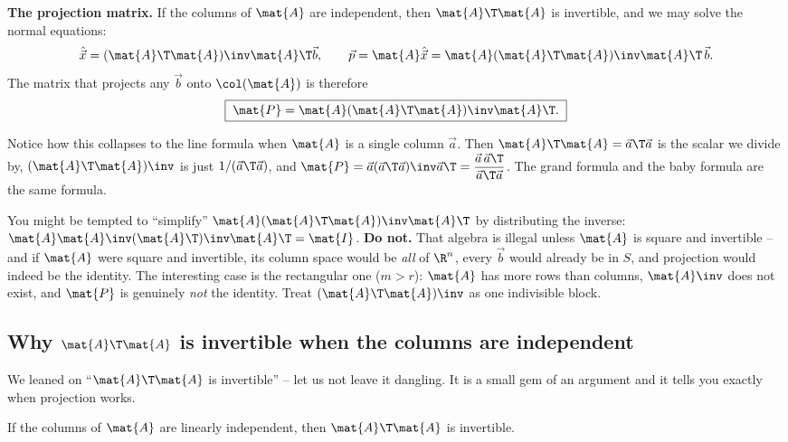 \begin{formalbox}
\textbf{The projection matrix.} If the columns of $\mat{A}$ are independent, then $\mat{A}\T\mat{A}$
is invertible, and we may solve the normal equations:
\[
  \hat{\vec{x}} = (\mat{A}\T\mat{A})\inv\mat{A}\T\vec{b},
  \qquad
  \vec{p} = \mat{A}\hat{\vec{x}} = \mat{A}(\mat{A}\T\mat{A})\inv\mat{A}\T\,\vec{b}.
\]
The matrix that projects any $\vec{b}$ onto $\col(\mat{A})$ is therefore
\[
  \boxed{\;\mat{P} = \mat{A}(\mat{A}\T\mat{A})\inv\mat{A}\T.\;}
\]
\end{formalbox}

Notice how this collapses to the line formula when $\mat{A}$ is a single column $\vec{a}$. Then
$\mat{A}\T\mat{A}=\vec{a}\T\vec{a}$ is the scalar we divide by, $(\mat{A}\T\mat{A})\inv$ is just
$1/(\vec{a}\T\vec{a})$, and $\mat{P}=\vec{a}(\vec{a}\T\vec{a})\inv\vec{a}\T
= \dfrac{\vec{a}\,\vec{a}\T}{\vec{a}\T\vec{a}}$. The grand formula and the baby formula are the same
formula.

\begin{trapbox}
You might be tempted to ``simplify''
$\mat{A}(\mat{A}\T\mat{A})\inv\mat{A}\T$ by distributing the inverse:
$\mat{A}\mat{A}\inv(\mat{A}\T)\inv\mat{A}\T = \mat{I}$. \textbf{Do not.} That algebra is illegal
unless $\mat{A}$ is square and invertible -- and if $\mat{A}$ were square and invertible, its column
space would be \emph{all} of $\R^n$, every $\vec{b}$ would already be in $S$, and projection would
indeed be the identity. The interesting case is the rectangular one ($m>r$): $\mat{A}$ has more
rows than columns, $\mat{A}\inv$ does not exist, and $\mat{P}$ is genuinely \emph{not} the
identity. Treat $(\mat{A}\T\mat{A})\inv$ as one indivisible block.
\end{trapbox}

\subsection{Why $\mat{A}\T\mat{A}$ is invertible when the columns are independent}

We leaned on ``$\mat{A}\T\mat{A}$ is invertible'' -- let us not leave it dangling. It is a small gem
of an argument and it tells you exactly when projection works.

\begin{lemma}\label{ch18:ata-invertible}
If the columns of $\mat{A}$ are linearly independent, then $\mat{A}\T\mat{A}$ is invertible.
\end{lemma}

